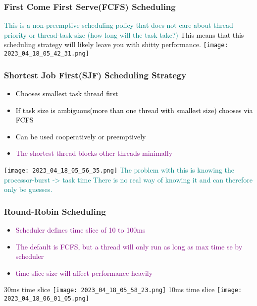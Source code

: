 \documentclass[main.tex,fontsize=8pt,paper=a4,paper=portrait,DIV=calc,]{scrartcl}
\begin{document}
\subsubsection{First Come First Serve(FCFS) Scheduling}
\textcolor{teal}{This is a non-preemptive scheduling policy that does not care about thread priority or thread-task-size (how long will the task take?)}\newline
This means that this scheduling strategy will likely leave you with shitty performance.\newline
\texttt{[image: 2023\_04\_18\_05\_42\_31.png]}

\subsubsection{Shortest Job First(SJF) Scheduling Strategy}
\begin{itemize}
\item \textcolor{black}{Chooses smallest task thread first}
\item \textcolor{black}{If task size is ambiguous(more than one thread with smallest size) chooses via FCFS}
\item \textcolor{black}{Can be used cooperatively or preemptively}
\item \textcolor{purple}{The shortest thread blocks other threads minimally}
\end{itemize} 
\texttt{[image: 2023\_04\_18\_05\_56\_35.png]}\newline
\textcolor{teal}{The problem with this is knowing the processor-burst -> task time\newline
There is no real way of knowing it and can therefore only be guesses.}

\subsubsection{Round-Robin Scheduling}
\begin{itemize}
\item \textcolor{purple}{Scheduler defines time slice of 10 to 100ms}
\item \textcolor{purple}{The default is FCFS, but a thread will only run as long as max time se by scheduler}
\item \textcolor{purple}{time slice size will affect performance heavily}
\end{itemize} 
30ms time slice\newline
\texttt{[image: 2023\_04\_18\_05\_58\_23.png]}\newline
10ms time slice\newline
\texttt{[image: 2023\_04\_18\_06\_01\_05.png]}
\end{document}

